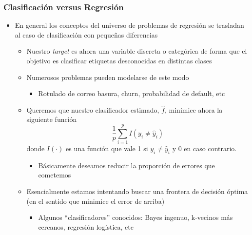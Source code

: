\documentclass[leqno, 10pt, envcountsect]{beamer}
\numberwithin{equation}{section}
\theoremstyle{definition}
\theoremstyle{example}
\numberwithin{figure}{section}
\numberwithin{table}{section}
\let\olditem\item
\renewcommand{\item}{%
\olditem\vspace{1pt}}
\begin{document}
\begin{frame}[fragile=singleslide]
  \frametitle{Clasificación versus Regresión}
\begin{itemize}
  \item En general los conceptos del universo de problemas de regresión se
    trasladan al caso de clasificación con pequeñas diferencias
    \begin{itemize}
      \item Nuestro \textit{target} es ahora una variable discreta o
        categórica de forma que el objetivo es clasificar etiquetas
        desconocidas en distintas clases
      \item Numerosos problemas pueden modelarse de este modo
        \begin{itemize}
          \item Rotulado de correo basura, churn, probabilidad de default, etc
        \end{itemize}
      \item Queremos que nuestro clasificador estimado, $\hat{f}$, minimice
        ahora la siguiente función
      \begin{equation*}
        \frac{1}{p}\sum_{i=1}^{p}I(y_{i} \not = \hat{y}_{i})
      \end{equation*}
      donde $I(\cdot)$ es una función que vale 1 si $y_{i} \not = \hat{y}_{i}$
        y 0 en caso contrario.
        \begin{itemize}
          \item Básicamente deseamos reducir la proporción de errores que
            cometemos
        \end{itemize}
      \item Esencialmente estamos intentando buscar una frontera de decisión
        óptima (en el sentido que minimice el error de arriba)
        \begin{itemize}
          \item Algunos \enquote{clasificadores} conocidos: Bayes ingenuo,
            k-vecinos más cercanos, regresión logística, etc
        \end{itemize}
    \end{itemize}
\end{itemize}
\begin{center}

\end{center}
\end{frame}
\end{document}
